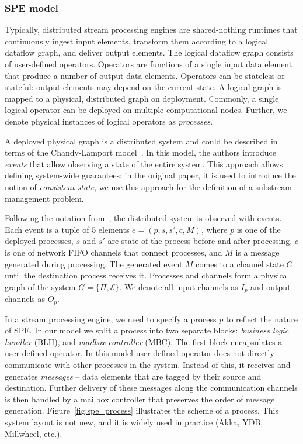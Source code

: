 \subsubsection{SPE model}

Typically, distributed stream processing engines are shared-nothing runtimes that continuously ingest input elements, transform them according to a logical dataflow graph, and deliver output elements. The logical dataflow graph consists of user-defined operators. Operators are functions of a single input data element that produce a number of output data elements. Operators can be stateless or stateful: output elements may depend on the current state. A logical graph is mapped to a physical, distributed graph on deployment. Commonly, a single logical operator can be deployed on multiple computational nodes. Further, we denote physical instances of logical operators as {\em processes}.

A deployed physical graph is a distributed system and could be described in terms of the Chandy-Lamport model~\cite{Chandy:1985:DSD:214451.214456, carbone2018scalable}. In this model, the authors introduce \textit{events} that allow observing a state of the entire system. This approach allows defining system-wide guarantees: in the original paper, it is used to introduce the notion of {\em consistent state}, we use this approach for the definition of a substream management problem.

Following the notation from~\cite{Chandy:1985:DSD:214451.214456, carbone2018scalable}, the distributed system is observed with events. Each event is a tuple of 5 elements $e = (p, s, s', c, M)$, where $p$ is one of the deployed processes, $s$ and $s'$ are state of the process before and after processing, $c$ is one of network FIFO channels that connect processes, and $M$ is a message generated during processing. The generated event $M$ comes to a channel state $C$ until the destination process receives it. Processes and channels form a physical graph of the system $G=\{\Pi,\mathcal{E}\}$. We denote all input channels as $I_p$ and output channels as $O_p$.

In a stream processing engine, we need to specify a process $p$ to reflect the nature of SPE. In our model we split a process into two separate blocks: {\em business logic handler} (BLH), and {\em mailbox controller} (MBC). The first block encapsulates a user-defined operator. In this model user-defined operator does not directly communicate with other processes in the system. Instead of this, it receives and generates {\em messages} -- data elements that are tagged by their source and destination. Further delivery of these messages along the communication channels is then handled by a mailbox controller that preserves the order of message generation. Figure~\ref{fig:spe_process} illustrates the scheme of a process. This system layout is not new, and it is widely used in practice (Akka, YDB, Millwheel, etc.).

